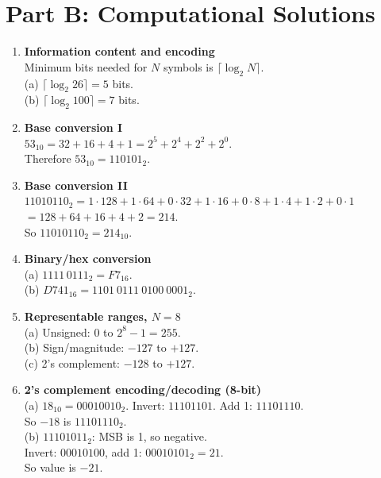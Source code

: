 \documentclass[11pt]{article}
\begin{document}
\section*{Part B: Computational Solutions}
\begin{enumerate}[label=\textbf{B\arabic*.}]
  \item \textbf{Information content and encoding}\\
  Minimum bits needed for \(N\) symbols is \(\lceil \log_2 N \rceil\).\\
  (a) \(\lceil \log_2 26 \rceil = 5\) bits.\\
  (b) \(\lceil \log_2 100 \rceil = 7\) bits.

  \item \textbf{Base conversion I}\\
  \(53_{10}=32+16+4+1=2^5+2^4+2^2+2^0\).\\
  Therefore \(53_{10}=110101_2\).

  \item \textbf{Base conversion II}\\
  \(11010110_2 = 1\cdot128 + 1\cdot64 + 0\cdot32 + 1\cdot16 + 0\cdot8 + 1\cdot4 + 1\cdot2 + 0\cdot1\)\\
  \(=128+64+16+4+2=214\).\\
  So \(11010110_2=214_{10}\).

  \item \textbf{Binary/hex conversion}\\
  (a) \(1111\,0111_2 = F7_{16}\).\\
  (b) \(D741_{16}=1101\ 0111\ 0100\ 0001_2\).

  \item \textbf{Representable ranges, \(N=8\)}\\
  (a) Unsigned: \(0\) to \(2^8-1=255\).\\
  (b) Sign/magnitude: \(-127\) to \(+127\).\\
  (c) 2's complement: \(-128\) to \(+127\).

  \item \textbf{2's complement encoding/decoding (8-bit)}\\
  (a) \(18_{10}=00010010_2\). Invert: \(11101101\). Add 1: \(11101110\).\\
  So \(-18\) is \(\boxed{11101110_2}\).\\
  (b) \(11101011_2\): MSB is 1, so negative.\\
  Invert: \(00010100\), add 1: \(00010101_2=21\).\\
  So value is \(\boxed{-21}\).


\end{enumerate}
\end{document}

